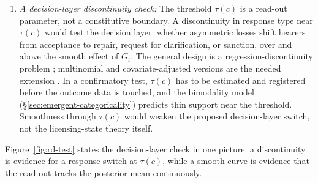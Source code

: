 \documentclass[12pt,letterpaper]{article}
\begin{document}
\begin{enumerate}
\item \emph{A decision-layer discontinuity check:} The threshold $\tau(c)$ is a
read-out parameter, not a constitutive boundary. A discontinuity in response type
near $\tau(c)$ would test the decision layer: whether asymmetric losses shift
hearers from acceptance to repair, request for clarification, or sanction,
over and above the smooth effect of $G_t$. The general design is a
regression-discontinuity problem \autocite{LeeLemieux2010,CalonicoCattaneoTitiunik2014};
multinomial and covariate-adjusted versions are the needed extension
\autocite{Lazzaro2026}. In a confirmatory test, $\tau(c)$ has to be estimated
and registered before the outcome data is touched, and the bimodality model
(\S\ref{sec:emergent-categoricality}) predicts thin support near the threshold.
Smoothness through $\tau(c)$ would weaken the proposed decision-layer switch,
not the licensing-state theory itself.
\end{enumerate}

Figure~\ref{fig:rd-test} states the decision-layer check in one picture: a discontinuity is evidence for a response switch at $\tau(c)$, while a smooth curve is evidence that the read-out tracks the posterior mean continuously.
\end{document}
